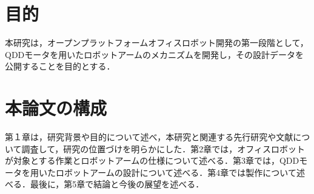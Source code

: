 
\section{目的}
本研究は，オープンプラットフォームオフィスロボット開発の第一段階として，QDDモータを用いたロボットアームのメカニズムを開発し，その設計データを公開することを目的とする．
\section{本論文の構成}
第１章は，研究背景や目的について述べ，本研究と関連する先行研究や文献について調査して，研究の位置づけを明らかにした．第2章では，オフィスロボットが対象とする作業とロボットアームの仕様について述べる．第3章では，QDDモータを用いたロボットアームの設計について述べる．第4章では製作について述べる．最後に，第5章で結論と今後の展望を述べる．

\newpage